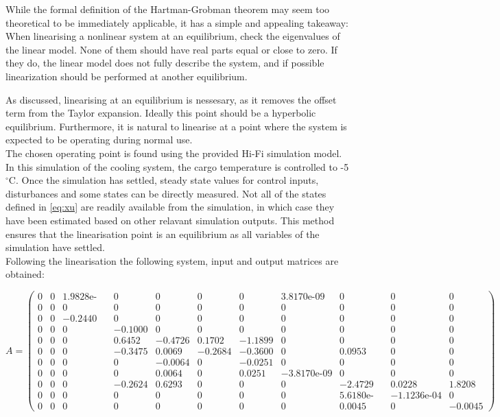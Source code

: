 While the formal definition of the Hartman-Grobman theorem may seem too theoretical to be immediately applicable, it has a simple and appealing takeaway: When linearising a nonlinear system at an equilibrium, check the eigenvalues of the linear model. None of them should have real parts equal or close to zero. If they do, the linear model does not fully describe the system, and if possible linearization should be performed at another equilibrium.


As discussed, linearising at an equilibrium is nessesary, as it removes the offset term from the Taylor expansion. Ideally this point should be a hyperbolic equilibrium. Furthermore, it is natural to linearise at a point where the system is expected to be operating during normal use. \\

The chosen operating point is found using the provided Hi-Fi simulation model. In this simulation of the cooling system, the cargo temperature is controlled to -5$^{\circ}$C. Once the simulation has settled, steady state values for control inputs, disturbances and some states can be directly measured. Not all of the states defined in \cref{eq:xu} are readily available from the simulation, in which case they have been estimated based on other relavant simulation outputs. This method ensures that the linearisation point is an equilibrium as all variables of the simulation have settled.\\


Following the linearisation the following system, input and output matrices are obtained:

\begin{equation}  \label{eq:A_full}
	A =
	\left(\begin{array}{ccccccccccc}
		0 & 0 & \text{1.9828e-04} & 0 & 0 & 0 & 0 & \text{3.8170e-09} & 0 & 0 & 0\\
		0 & 0 & 0 & 0 & 0 & 0 & 0 & 0 & 0 & 0 & 0\\
		0 & 0 & -0.2440 & 0 & 0 & 0 & 0 & 0 & 0 & 0 & 0\\
		0 & 0 & 0 & -0.1000 & 0 & 0 & 0 & 0 & 0 & 0 & 0\\
		0 & 0 & 0 & 0.6452 & -0.4726 & 0.1702 & -1.1899 & 0 & 0 & 0 & 0\\
		0 & 0 & 0 & -0.3475 & 0.0069 & -0.2684 & -0.3600 & 0 & 0.0953 & 0 & 0\\
		0 & 0 & 0 & 0 & -0.0064 & 0 & -0.0251 & 0 & 0 & 0 & 0\\
		0 & 0 & 0 & 0 & 0.0064 & 0 & 0.0251 & -\text{3.8170e-09} & 0 & 0 & 0\\
		0 & 0 & 0 & -0.2624 & 0.6293 & 0 & 0 & 0 & -2.4729 & 0.0228 & 1.8208\\
		0 & 0 & 0 & 0 & 0 & 0 & 0 & 0 & \text{5.6180e-05} & -\text{1.1236e-04} & 0\\
		0 & 0 & 0 & 0 & 0 & 0 & 0 & 0 & 0.0045 & 0 & -0.0045
	\end{array}\right)
\end{equation}

